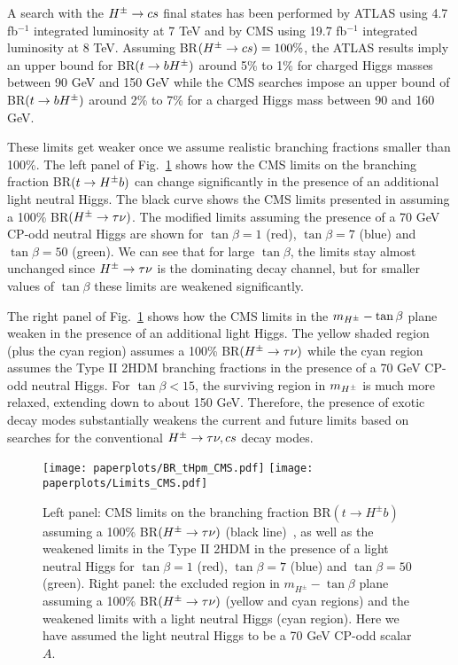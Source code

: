 A search with the $H^{\pm} \rightarrow cs$ final states has been performed by ATLAS \cite{Aad:2013hla}  using 4.7 fb$^{-1}$ integrated luminosity at 7 TeV and by CMS \cite{CMS:2014kga}  using 19.7 fb$^{-1}$ integrated luminosity at 8 TeV.    Assuming BR$(H^{\pm} \rightarrow c s) = 100 \%$,  the ATLAS results imply an upper bound for  BR$(t \rightarrow b H^{\pm} )$ around  5\% to  1\% for charged Higgs masses between 90 GeV and 150 GeV while the CMS searches impose an upper bound of BR$(t \rightarrow b H^{\pm} ) $  around 2\% to  7\% for a charged Higgs mass between 90 and 160 GeV.

These limits get weaker once we assume realistic branching fractions smaller than 100\%. The left panel of Fig.~\ref{fig:lim_BR_Hpm} shows how the  CMS limits on the branching fraction BR$(t \to H^{\pm} b)$ can change  significantly in the presence of an additional light  neutral Higgs.  The black curve shows the CMS limits presented in \cite{CMS:2014cdp} assuming a 100\% BR$(H^{\pm} \to \tau \nu)$.   The modified limits assuming the presence of a 70 GeV CP-odd neutral Higgs are shown for $\tan\beta=1$ (red), $\tan\beta=7$ (blue) and $\tan\beta=50$ (green). We can see that for large $\tan\beta$,  the limits stay almost unchanged since $H^{\pm} \to \tau \nu$ is the dominating decay channel, but for smaller values of $\tan\beta$ these limits are weakened significantly.

The right panel of Fig.~\ref{fig:lim_BR_Hpm} shows how the CMS limits in the $m_{H^{\pm}}-\tan\beta$ plane  weaken in the presence of an additional light Higgs.   The yellow shaded region (plus the cyan region)  assumes a 100\% BR$(H^{\pm} \to \tau \nu)$ while the cyan region assumes the Type II 2HDM branching fractions in the presence of a 70 GeV CP-odd neutral Higgs.     For $\tan\beta<15$,  the surviving region in $m_{H^{\pm}}$ is much more relaxed, extending down to about 150 GeV.   Therefore,  the presence of exotic decay modes substantially weakens the current and future limits based on  searches for the conventional $H^{\pm} \rightarrow \tau \nu, cs$ decay modes. 

 \begin{figure}[h!]
 \centering
 	\texttt{[image: paperplots/BR\_tHpm\_CMS.pdf]}
 	\texttt{[image: paperplots/Limits\_CMS.pdf]}
\caption{Left panel: CMS  limits on the branching fraction BR$(  t \to H^{\pm}b)$ assuming a 100\% BR$(H^{\pm} \to \tau \nu)$ (black line)~\cite{CMS:2014cdp}, as well as the weakened limits in the Type II 2HDM in the presence of a light neutral Higgs for $\tan\beta=1$ (red), $\tan\beta=7$ (blue) and $\tan\beta=50$ (green).  Right panel:  the excluded region in $m_{H^\pm}-\tan\beta$ plane assuming a 100\% BR$(H^{\pm} \to \tau \nu)$ (yellow   and cyan regions) and the weakened limits  with a light neutral Higgs (cyan region).  Here we have assumed the light neutral Higgs to be a 70 GeV CP-odd scalar $A$.}
\label{fig:lim_BR_Hpm}
\end{figure}




